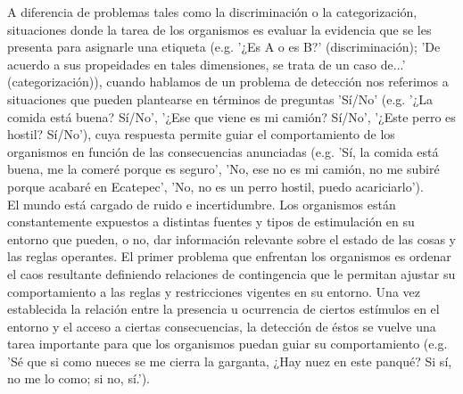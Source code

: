 A diferencia de problemas tales como la discriminación o la categorización, situaciones donde la tarea de los organismos es evaluar la evidencia que se les presenta para asignarle una etiqueta (e.g. '¿Es A o es B?' (discriminación); 'De acuerdo a sus propeidades en tales dimensiones, se trata de un caso de...' (categorización)), cuando hablamos de un problema de detección nos referimos a situaciones que pueden plantearse en términos de preguntas 'Sí/No' (e.g. '¿La comida está buena? Sí/No', '¿Ese que viene es mi camión? Sí/No', '¿Este perro es hostil? Sí/No'), cuya respuesta permite guiar el comportamiento de los organismos en función de las consecuencias anunciadas (e.g. 'Sí, la comida está buena, me la comeré porque es seguro', 'No, ese no es mi camión, no me subiré porque acabaré en Ecatepec', 'No, no es un perro hostil, puedo acariciarlo').\\ 

El mundo está cargado de ruido e incertidumbre. Los organismos están constantemente expuestos a distintas fuentes y tipos de estimulación en su entorno que pueden, o no, dar información relevante sobre el estado de las cosas y las reglas operantes. El primer problema que enfrentan los organismos es ordenar el caos resultante definiendo relaciones de contingencia que le permitan ajustar su comportamiento a las reglas y restricciones vigentes en su entorno. Una vez establecida la relación entre la presencia u ocurrencia de ciertos estímulos en el entorno y el acceso a ciertas consecuencias, la detección de éstos se vuelve una tarea importante para que los organismos puedan guiar su comportamiento (e.g. 'Sé que si como nueces se me cierra la garganta, ¿Hay nuez en este panqué? Si sí, no me lo como; si no, sí.').\\

